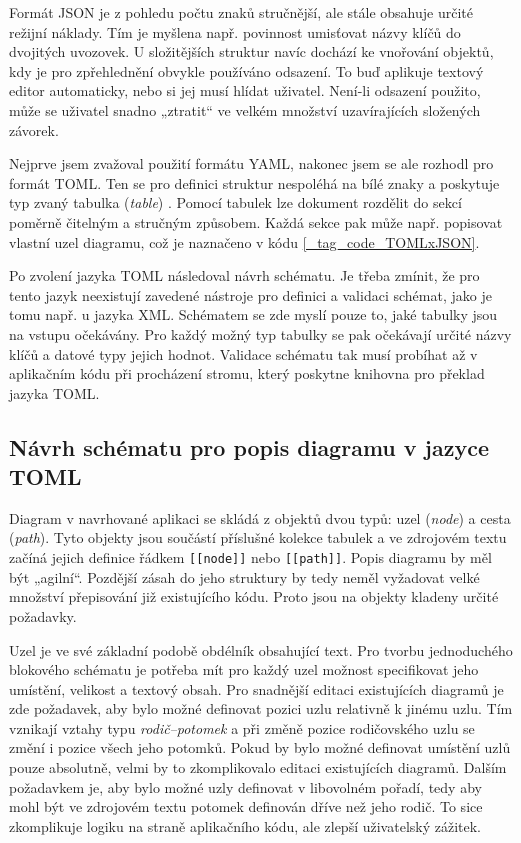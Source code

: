 \documentclass[FM,DP]{tulthesis}
\begin{document}
	Formát JSON je z pohledu počtu znaků stručnější, ale stále obsahuje určité režijní náklady. Tím je myšlena např. povinnost umisťovat názvy klíčů do dvojitých uvozovek. U složitějších struktur navíc dochází ke vnořování objektů, kdy je pro zpřehlednění obvykle používáno odsazení. To buď aplikuje textový editor automaticky, nebo si jej musí hlídat uživatel. Není-li odsazení použito, může se uživatel snadno „ztratit“ ve velkém množství uzavírajících složených závorek.
	
	Nejprve jsem zvažoval použití formátu YAML, nakonec jsem se ale rozhodl pro formát TOML. Ten se pro definici struktur nespoléhá na bílé znaky a poskytuje typ zvaný tabulka (\textit{table}) \cite{online_tomlspec}. Pomocí tabulek lze dokument rozdělit do sekcí poměrně čitelným a stručným způsobem. Každá sekce pak může např. popisovat vlastní uzel diagramu, což je naznačeno v kódu \ref{_tag_code_TOMLxJSON}.
	
	\begin{code}
		
		\caption{Rozdíl mezi formáty TOML a JSON}
		\label{_tag_code_TOMLxJSON}
	\end{code}
	
	Po zvolení jazyka TOML následoval návrh schématu. Je třeba zmínit, že pro tento jazyk neexistují zavedené nástroje pro definici a validaci schémat, jako je tomu např. u jazyka XML. Schématem se zde myslí pouze to, jaké tabulky jsou na vstupu očekávány. Pro každý možný typ tabulky se pak očekávají určité názvy klíčů a datové typy jejich hodnot. Validace schématu tak musí probíhat až v aplikačním kódu při procházení stromu, který poskytne knihovna pro překlad jazyka TOML.
	
	\subsection{Návrh schématu pro popis diagramu v jazyce TOML}
	
	Diagram v navrhované aplikaci se skládá z objektů dvou typů: uzel (\textit{node}) a cesta (\textit{path}). Tyto objekty jsou součástí příslušné kolekce tabulek a ve zdrojovém textu začíná jejich definice řádkem \texttt{[[node]]} nebo \texttt{[[path]]}. Popis diagramu by měl být „agilní“. Pozdější zásah do jeho struktury by tedy neměl vyžadovat velké množství přepisování již existujícího kódu. Proto jsou na objekty kladeny určité požadavky.
	
	Uzel je ve své základní podobě obdélník obsahující text. Pro tvorbu jednoduchého blokového schématu je potřeba mít pro každý uzel možnost specifikovat jeho umístění, velikost a textový obsah. Pro snadnější editaci existujících diagramů je zde požadavek, aby bylo možné definovat pozici uzlu relativně k jinému uzlu. Tím vznikají vztahy typu \textit{rodič–potomek} a při změně pozice rodičovského uzlu se změní i pozice všech jeho potomků. Pokud by bylo možné definovat umístění uzlů pouze absolutně, velmi by to zkomplikovalo editaci existujících diagramů. Dalším požadavkem je, aby bylo možné uzly definovat v libovolném pořadí, tedy aby mohl být ve zdrojovém textu potomek definován dříve než jeho rodič. To sice zkomplikuje logiku na straně aplikačního kódu, ale zlepší uživatelský zážitek.
	
\end{document}
